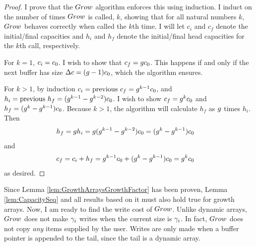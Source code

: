 \begin{proof}
	I prove that the $Grow$ algorithm enforces this using induction. I induct on the number of times $Grow$ is called, $k$, showing that for all natural numbers $k$, $Grow$ behaves correctly when called the $k$th time. I will let $c_i$ and $c_f$ denote the initial/final capacities and $h_i$ and $h_f$ denote the initial/final head capacities for the $k$th call, respectively.

	For $k = 1$, $c_i = c_0$. I wish to show that $c_f = gc_0$. This happens if and only if the next buffer has size $\Delta c = (g - 1)c_0$, which the algorithm ensures.
	
	For $k > 1$, by induction $c_i = \text{previous }c_f = g^{k - 1}c_0$, and $h_i = \text{previous }h_f = (g^{k - 1} - g^{k - 2})c_0$. I wish to show $c_f = g^{k}c_0$ and $h_f = (g^{k} - g^{k - 1})c_0$. Because $k > 1$, the algorithm will calculate $h_f$ as $g$ times $h_i$. Then
	\begin{align*}
	h_f &= g h_i = g (g^{k - 1} - g^{k - 2})c_0 = (g^{k} - g^{k - 1})c_0
	\end{align*}
	and
	\begin{align*}
	c_f &= c_i + h_f = g^{k - 1}c_0 + (g^{k} - g^{k - 1})c_0 = g^{k}c_0
	\end{align*}
	as desired.
\end{proof}

Since Lemma \ref{lem:GrowthArraysGrowthFactor} has been proven, Lemma \ref{lem:CapacitySeq} and all results based on it must also hold true for growth arrays. Now, I am ready to find the write cost of $Grow$. Unlike dynamic arrays, $Grow$ does not make $\gamma_i$ writes when the current size is $\gamma_i$. In fact, $Grow$ does not copy \textit{any} items supplied by the user. Writes are only made when a buffer pointer is appended to the tail, since the tail is a dynamic array.

